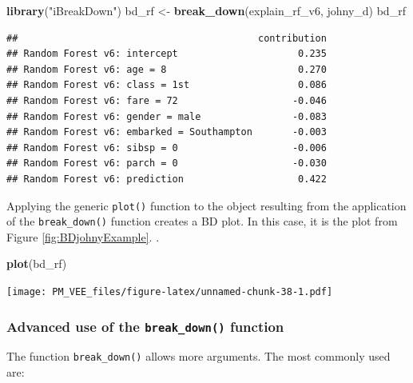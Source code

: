 \documentclass[12pt,]{krantz}
\newenvironment{Shaded}{\begin{snugshade}}{\end{snugshade}}
\newcommand{\KeywordTok}[1]{\textcolor[rgb]{0.13,0.29,0.53}{\textbf{#1}}}
\newcommand{\NormalTok}[1]{#1}
\newcommand{\StringTok}[1]{\textcolor[rgb]{0.31,0.60,0.02}{#1}}
\begin{document}
\begin{Shaded}
\begin{Highlighting}[]
\KeywordTok{library}\NormalTok{(}\StringTok{"iBreakDown"}\NormalTok{)}
\NormalTok{bd_rf <-}\StringTok{ }\KeywordTok{break_down}\NormalTok{(explain_rf_v6, johny_d)}
\NormalTok{bd_rf}
\end{Highlighting}
\end{Shaded}

\begin{verbatim}
##                                          contribution
## Random Forest v6: intercept                     0.235
## Random Forest v6: age = 8                       0.270
## Random Forest v6: class = 1st                   0.086
## Random Forest v6: fare = 72                    -0.046
## Random Forest v6: gender = male                -0.083
## Random Forest v6: embarked = Southampton       -0.003
## Random Forest v6: sibsp = 0                    -0.006
## Random Forest v6: parch = 0                    -0.030
## Random Forest v6: prediction                    0.422
\end{verbatim}

Applying the generic \texttt{plot()} function to the object resulting from the application of the \texttt{break\_down()} function creates a BD plot. In this case, it is the plot from Figure \ref{fig:BDjohnyExample}.
.

\begin{Shaded}
\begin{Highlighting}[]
\KeywordTok{plot}\NormalTok{(bd_rf) }
\end{Highlighting}
\end{Shaded}

\texttt{[image: PM\_VEE\_files/figure-latex/unnamed-chunk-38-1.pdf]}

\hypertarget{advanced-use-of-the-break_down-function}{%
\subsubsection{\texorpdfstring{Advanced use of the \texttt{break\_down()} function}{Advanced use of the break\_down() function}}\label{advanced-use-of-the-break_down-function}}

The function \texttt{break\_down()} allows more arguments. The most commonly used are:
\end{document}
